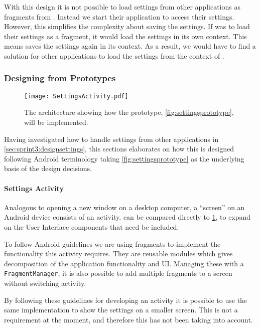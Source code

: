 With this design it is not possible to load settings from other applications as fragments from \launcher. Instead we start their application to access their settings.
However, this simplifies the complexity about saving the settings.
If \launcher was to load their settings as a fragment, it would load the settings in its own context. 
This means \launcher saves the settings again in its context.
As a result, we would have to find a solution for other applications to load the settings from the context of \launcher.

\subsubsection{Designing from Prototypes}

\begin{figure}[h]
\centering
\texttt{[image: SettingsActivity.pdf]}
\caption{The architecture showing how the prototype, \cref{fig:settingsprototype}, will be implemented.}
\label{fig:settingsarchitecture}
\end{figure}

Having investigated how to handle settings from other \giraf applications in \cref{sec:sprint3:designsettings}, this sections elaborates on how this is designed following Android terminology taking \cref{fig:settingsprototype} as the underlying basis of the design decisions.

\paragraph{Settings Activity}
Analogous to opening a new window on a desktop computer, a ``screen'' on an Android device consists of an activity.
 can be compared directly to \cref{fig:settingsarchitecture}, to expand on the User Interface components that need be included.

To follow Android guidelines we are using fragments\cite{fragments} to implement the functionality this activity requires. 
They are reusable modules which gives decomposition of the application functionality and UI.
Managing these with a \lstinline|FragmentManager|, it is also possible to add multiple fragments to a screen without switching activity.

By following these guidelines for developing an activity it is possible to use the same implementation to show the settings on a smaller screen.
This is not a requirement at the moment, and therefore this has not been taking into account.\\

